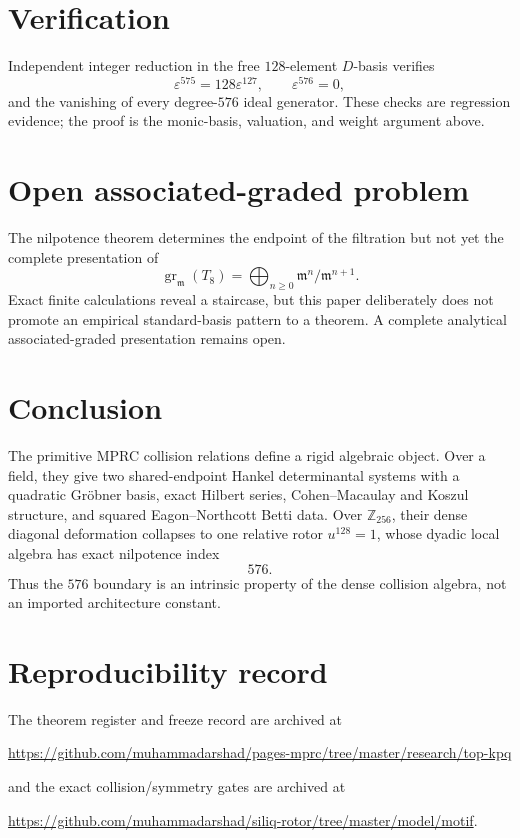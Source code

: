 \documentclass[11pt]{article}
\theoremstyle{definition}
\newcommand{\Z}{\mathbb{Z}}
\newcommand{\gr}{\operatorname{gr}}
\begin{document}
\section{Verification}
Independent integer reduction in the free $128$-element $D$-basis verifies
\[
\varepsilon^{575}=128\varepsilon^{127},\qquad
\varepsilon^{576}=0,
\]
and the vanishing of every degree-$576$ ideal generator. These checks are regression evidence; the proof is the monic-basis, valuation, and weight argument above.

\section{Open associated-graded problem}
The nilpotence theorem determines the endpoint of the filtration but not yet the complete presentation of
\[
\gr_{\mathfrak m}(T_8)
=
\bigoplus_{n\ge0}\mathfrak m^n/\mathfrak m^{n+1}.
\]
Exact finite calculations reveal a staircase, but this paper deliberately does not promote an empirical standard-basis pattern to a theorem. A complete analytical associated-graded presentation remains open.

\section{Conclusion}
The primitive MPRC collision relations define a rigid algebraic object. Over a field, they give two shared-endpoint Hankel determinantal systems with a quadratic Gröbner basis, exact Hilbert series, Cohen--Macaulay and Koszul structure, and squared Eagon--Northcott Betti data. Over $\Z_{256}$, their dense diagonal deformation collapses to one relative rotor $u^{128}=1$, whose dyadic local algebra has exact nilpotence index
\[
\boxed{576}.
\]
Thus the $576$ boundary is an intrinsic property of the dense collision algebra, not an imported architecture constant.

\section*{Reproducibility record}
The theorem register and freeze record are archived at
\begin{center}
\url{https://github.com/muhammadarshad/pages-mprc/tree/master/research/top-kpq}
\end{center}
and the exact collision/symmetry gates are archived at
\begin{center}
\url{https://github.com/muhammadarshad/siliq-rotor/tree/master/model/motif}.
\end{center}
\end{document}
